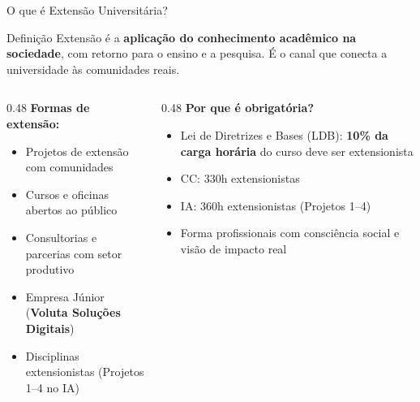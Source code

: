 \documentclass[aspectratio=169]{beamer}
\newcommand{\impt}[1]{\textcolor{morange}{\textbf{#1}}}
\newcommand{\ntc}[1]{\textcolor{mblue}{#1}}
\begin{document}
\begin{frame}{O que é Extensão Universitária?}
  \begin{block}{Definição}
    Extensão é a \impt{aplicação do conhecimento acadêmico na sociedade}, com retorno para o ensino e a pesquisa. É o canal que conecta a universidade às comunidades reais.
  \end{block}
  \vspace{0.0cm}
  \begin{columns}[T]
    \begin{column}{0.48\textwidth}
      \textbf{Formas de extensão:}
      \begin{itemize}\setlength\itemsep{3pt}
        \item Projetos de extensão com comunidades
        \item Cursos e oficinas abertos ao público
        \item Consultorias e parcerias com setor produtivo
        \item Empresa Júnior (\textbf{Voluta Soluções Digitais})
        \item Disciplinas extensionistas (\ntc{Projetos 1--4 no IA})
      \end{itemize}
    \end{column}
    \begin{column}{0.48\textwidth}
      \textbf{Por que é obrigatória?}
      \begin{itemize}\setlength\itemsep{3pt}
        \item Lei de Diretrizes e Bases (LDB): \impt{10\% da carga horária} do curso deve ser extensionista
        \item CC: 330h extensionistas
        \item IA: 360h extensionistas (Projetos 1--4)
        \item Forma profissionais com \ntc{consciência social} e visão de impacto real
      \end{itemize}
    \end{column}
  \end{columns}
\end{frame}
\end{document}
